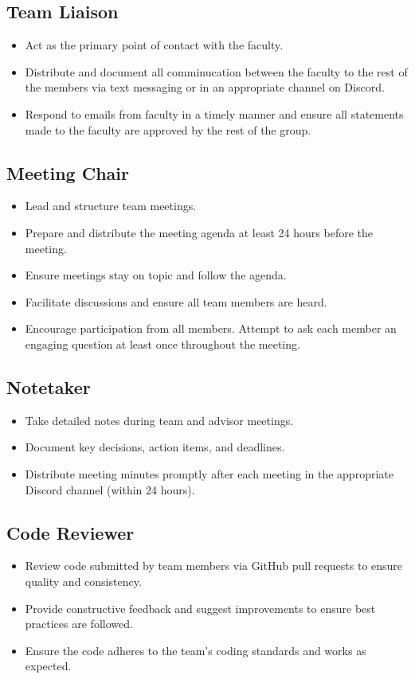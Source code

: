 \documentclass{article}
\begin{document}
\subsection{Team Liaison}
  \begin{itemize}
    \item Act as the primary point of contact with the faculty.
    \item Distribute and document all comminucation between the faculty to the rest of the members via text messaging or in an appropriate channel on Discord.
    \item Respond to emails from faculty in a timely manner and ensure all statements made to the faculty are approved by the rest of the group.
  \end{itemize}


\subsection{Meeting Chair} 
  \begin{itemize}
    \item Lead and structure team meetings.
    \item Prepare and distribute the meeting agenda at least 24 hours before the meeting.
    \item Ensure meetings stay on topic and follow the agenda.
    \item Facilitate discussions and ensure all team members are heard.
    \item Encourage participation from all members. Attempt to ask each member an engaging question at least once throughout the meeting.
  \end{itemize}

\subsection{Notetaker}
  \begin{itemize}
    \item Take detailed notes during team and advisor meetings.
    \item Document key decisions, action items, and deadlines.
    \item Distribute meeting minutes promptly after each meeting in the appropriate Discord channel (within 24 hours).
  \end{itemize}

  \subsection{Code Reviewer}
  \begin{itemize}
    \item Review code submitted by team members via GitHub pull requests to ensure quality and consistency.
    \item Provide constructive feedback and suggest improvements to ensure best practices are followed.
    \item Ensure the code adheres to the team's coding standards and works as expected.
  \end{itemize}
\end{document}
